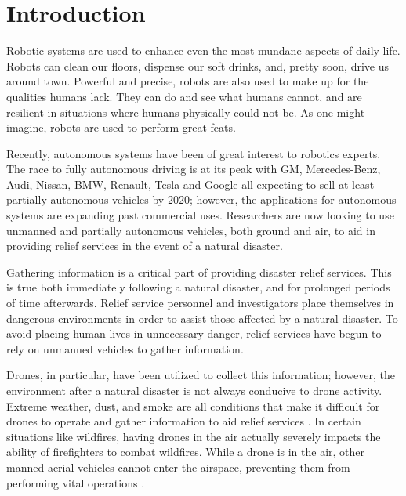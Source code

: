 \chapter{Introduction}

\setcounter{page}{1}
\graphicspath{{images/}}
Robotic systems are used to enhance even the most mundane aspects of daily life. Robots can clean our floors, dispense our soft drinks, and, pretty soon, drive us around town. Powerful and precise, robots are also used to make up for the qualities humans lack. They can do and see what humans cannot, and are resilient in situations where humans physically could not be. As one might imagine, robots are used to perform great feats. 

	Recently, autonomous systems have been of great interest to robotics experts. The race to fully autonomous driving is at its peak with GM, Mercedes-Benz, Audi, Nissan, BMW, Renault, Tesla and Google all expecting to sell at least partially autonomous vehicles by 2020\cite{autonomouscars}; however, the applications for autonomous systems are expanding past commercial uses. Researchers are now looking to use unmanned and partially autonomous vehicles, both ground and air, to aid in providing relief services in the event of a natural disaster.\cite{dronesrescueservices}
    
	Gathering information is a critical part of providing disaster relief services.  This is true both immediately following a natural disaster, and for prolonged periods of time afterwards.  Relief service personnel and investigators place themselves in dangerous environments in order to assist those affected by a natural disaster.  To avoid placing human lives in unnecessary danger, relief services have begun to rely on unmanned vehicles to gather information. 
    
	Drones, in particular, have been utilized to collect this information; however, the environment after a natural disaster is not always conducive to drone activity.  Extreme weather, dust, and smoke are all conditions that make it difficult for drones to operate and gather information to aid relief services \cite{aerialsupervisionguide}.  In certain situations like wildfires, having drones in the air actually severely impacts the ability of firefighters to combat wildfires.  While a drone is in the air, other manned aerial vehicles cannot enter the airspace, preventing them from performing vital operations \cite{firedrones}.

